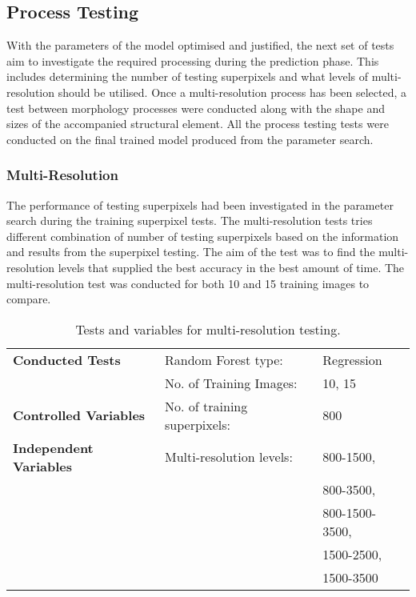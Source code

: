 \subsection{Process Testing}
With the parameters of the model optimised and justified, the next set of tests aim to investigate the required processing during the prediction phase. This includes determining the number of testing superpixels and what levels of multi-resolution should be utilised. Once a multi-resolution process has been selected, a test between morphology processes were conducted along with the shape and sizes of the accompanied structural element. All the process testing tests were conducted on the final trained model produced from the parameter search. 

\subsubsection{Multi-Resolution}
The performance of testing superpixels had been investigated in the parameter search during the training superpixel tests. The multi-resolution tests tries different combination of number of testing superpixels based on the information and results from the superpixel testing. The aim of the test was to find the multi-resolution levels that supplied the best accuracy in the best amount of time. The multi-resolution test was conducted for both 10 and 15 training images to compare. 

\begin{table}[H]
\centering
\caption{Tests and variables for multi-resolution testing.}

\begin{tabular}{|l|ll|}
\hline
\textbf{Conducted Tests}	& Random Forest type: & Regression\\	
	&  No. of Training Images: & 10, 15\\
	
\hline
\textbf{Controlled Variables} & No. of training superpixels: & 800 \\
\hline
\textbf{Independent Variables} & Multi-resolution levels:& 800-1500, \\
	& 	& 800-3500,\\
	&	& 800-1500-3500,\\
	&	& 1500-2500,\\
	&	& 1500-3500\\
\hline				    	 			   			    	 
\end{tabular}
\label{table:multires}
\end{table}

